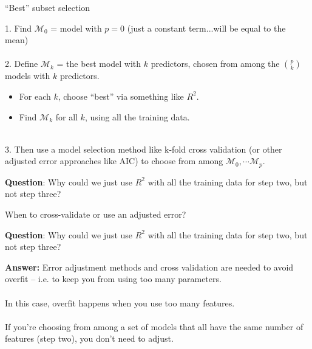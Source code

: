 \documentclass[mathserif, aspectratio=169]{beamer}
\newcommand{\vs}{\vspace{5mm}}
\begin{document}
\begin{frame}{``Best'' subset selection}

1. Find $\mathcal{M}_0$ = model with $p=0$ (just a constant term...will be equal to the mean)\\~\\

2. Define $\mathcal{M}_k$ = the best model with $k$ predictors, chosen from among the $p\choose{k}$ models with $k$ predictors.  
\begin{itemize}
	\item For each $k$, choose ``best'' via something like $R^2$.  
	\item Find $\mathcal{M}_k$ for all $k$, using all the training data.\\~\\
\end{itemize}

3. Then use a model selection method like k-fold cross validation (or other adjusted error approaches like AIC) to choose from among $\mathcal{M}_0,\cdots\mathcal{M}_p$.

\pause 

\vs

\textbf{Question}:  Why could we just use $R^2$ with all the training data for step two, but not step three?

\end{frame}

\begin{frame}{When to cross-validate or use an adjusted error?}

\textbf{Question}:  Why could we just use $R^2$ with all the training data for step two, but not step three?

\vspace*{3mm}

\pause
\textbf{Answer:} Error adjustment methods and cross validation are needed to avoid overfit -- i.e. to keep you from using too many parameters.  \\~\\

In this case, overfit happens when you use too many features.\\~\\

If you're choosing from among a set of models that all have the same number of features (step two), you don't need to adjust.

\end{frame}
\end{document}
